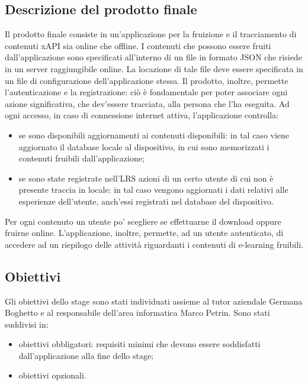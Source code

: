 \documentclass[../Tesi.tex]{subfiles}
\begin{document}
	\subsection{Descrizione del prodotto finale}
	Il prodotto finale consiste in un'applicazione per la fruizione e il tracciamento di contenuti xAPI sia online che offline. I contenuti che possono essere fruiti dall’applicazione sono specificati all'interno di un file in formato JSON che risiede in un server raggiungibile online. La locazione di tale file deve essere specificata in un file di configurazione dell'applicazione stessa. Il prodotto, inoltre, permette l'autenticazione e la registrazione: ciò è fondamentale per poter associare ogni azione significativa, che dev'essere tracciata, alla persona che l'ha eseguita. Ad ogni accesso, in caso di connessione internet attiva, l'applicazione controlla:
	\begin{itemize}
		\item se sono disponibili aggiornamenti ai contenuti disponibili: in tal caso viene aggiornato il database locale al dispositivo, in cui sono memorizzati i contenuti fruibili dall'applicazione;
		\item se sono state registrate nell'LRS azioni di un certo utente di cui non è presente traccia in locale: in tal caso vengono aggiornati i dati relativi alle esperienze dell'utente, anch'essi registrati nel database del dispositivo.
	\end{itemize} 
	Per ogni contenuto un utente po' scegliere se effettuarne il download oppure fruirne online.
	L'applicazione, inoltre, permette, ad un utente autenticato, di accedere ad un riepilogo delle attività riguardanti i contenuti di e-learning fruibili. 

	\subsection{Obiettivi}
		Gli obiettivi dello stage sono stati individuati assieme al tutor aziendale Germana Boghetto e al responsabile dell'area informatica Marco Petrin. Sono stati suddivisi in:
		\begin{itemize}
			\item obiettivi obbligatori: requisiti minimi che devono essere soddisfatti dall'applicazione alla fine dello stage;
			\item obiettivi opzionali.
		\end{itemize}
\end{document}
